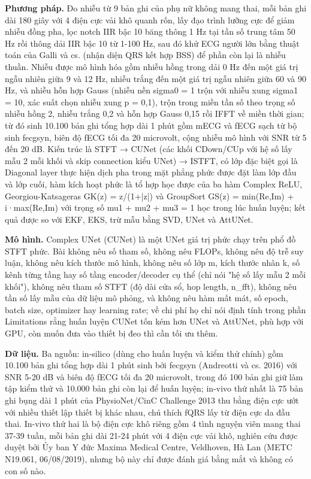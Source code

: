 \documentclass[12pt,a4paper]{article}
\begin{document}
\noindent \textbf{Phương pháp.} Đo nhiễu từ 9 bản ghi của phụ nữ không mang thai, mỗi bản ghi dài 180 giây với 4 điện cực vải khô quanh rốn, lấy đạo trình lưỡng cực để giảm nhiễu đồng pha, lọc notch IIR bậc 10 băng thông 1 Hz tại tần số trung tâm 50 Hz rồi thông dải IIR bậc 10 từ 1-100 Hz, sau đó khử ECG người lớn bằng thuật toán của Galli và cs. (nhận diện QRS kết hợp BSS) để phần còn lại là nhiễu thuần. Nhiễu được mô hình hóa gồm nhiễu hồng trong dải 0 Hz đến một giá trị ngẫu nhiên giữa 9 và 12 Hz, nhiễu trắng đến một giá trị ngẫu nhiên giữa 60 và 90 Hz, và nhiễu hỗn hợp Gauss (nhiễu nền sigma0 = 1 trộn với nhiễu xung sigma1 = 10, xác suất chọn nhiễu xung p = 0,1), trộn trong miền tần số theo trọng số nhiễu hồng 2, nhiễu trắng 0,2 và hỗn hợp Gauss 0,15 rồi IFFT về miền thời gian; từ đó sinh 10.100 bản ghi tổng hợp dài 1 phút gồm mECG và fECG sạch từ bộ sinh fecgsyn, biên độ fECG tối đa 20 microvolt, cộng nhiễu mô hình với SNR từ 5 đến 20 dB. Kiến trúc là STFT → CUNet (các khối CDown/CUp với hệ số lấy mẫu 2 mỗi khối và skip connection kiểu UNet) → ISTFT, có lớp đặc biệt gọi là Diagonal layer thực hiện dịch pha trong mặt phẳng phức được đặt làm lớp đầu và lớp cuối, hàm kích hoạt phức là tổ hợp học được của ba hàm Complex ReLU, Georgiou-Katsageras GK(z) = z/(1+|z|) và GroupSort GS(z) = min(Re,Im) + i·max(Re,Im) với trọng số mu1 + mu2 + mu3 = 1 học trong lúc huấn luyện; kết quả được so với EKF, EKS, trừ mẫu bằng SVD, UNet và AttUNet.\par\vspace{3pt}
\noindent \textbf{Mô hình.} Complex UNet (CUNet) là một UNet giá trị phức chạy trên phổ đồ STFT phức. Bài không nêu số tham số, không nêu FLOPs, không nêu độ trễ suy luận, không nêu kích thước mô hình, không nêu số lớp m, kích thước nhân k, số kênh từng tầng hay số tầng encoder/decoder cụ thể (chỉ nói "hệ số lấy mẫu 2 mỗi khối"), không nêu tham số STFT (độ dài cửa sổ, hop length, n\_fft), không nêu tần số lấy mẫu của dữ liệu mô phỏng, và không nêu hàm mất mát, số epoch, batch size, optimizer hay learning rate; về chi phí họ chỉ nói định tính trong phần Limitations rằng huấn luyện CUNet tốn kém hơn UNet và AttUNet, phù hợp với GPU, còn muốn đưa vào thiết bị đeo thì cần tối ưu thêm.\par\vspace{3pt}
\noindent \textbf{Dữ liệu.} Ba nguồn: in-silico (dùng cho huấn luyện và kiểm thử chính) gồm 10.100 bản ghi tổng hợp dài 1 phút sinh bởi fecgsyn (Andreotti và cs. 2016) với SNR 5-20 dB và biên độ fECG tối đa 20 microvolt, trong đó 100 bản ghi giữ làm tập kiểm thử và 10.000 bản ghi còn lại để huấn luyện; in-vivo thứ nhất là 75 bản ghi bụng dài 1 phút của PhysioNet/CinC Challenge 2013 thu bằng điện cực ướt với nhiều thiết lập thiết bị khác nhau, chú thích fQRS lấy từ điện cực da đầu thai. In-vivo thứ hai là bộ điện cực khô riêng gồm 4 tình nguyện viên mang thai 37-39 tuần, mỗi bản ghi dài 21-24 phút với 4 điện cực vải khô, nghiên cứu được duyệt bởi Ủy ban Y đức Maxima Medical Centre, Veldhoven, Hà Lan (METC N19.061, 06/08/2019), nhưng bộ này chỉ được đánh giá bằng mắt và không có con số nào.\par\vspace{3pt}
\end{document}
